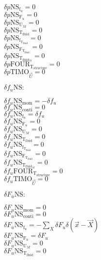 \documentclass[10pt]{article} %
\begin{document}
\begin{center}
	$\delta p \text{NS}_{\text{f}_u} = 0$\\
	$\delta p \text{NS}_{\text{F}_u} = 0$\\
	$\delta p \text{NS}_{\text{U}_M} = 0$\\
	$\delta p \text{NS}_{\text{T}_{\text{fluid}}} = 0$\\
	$\delta p \text{NS}_{\text{f}_{\text{T}_{\text{fluid}}}} = 0$\\
	$\delta p \text{NS}_{\text{F}_{\text{T}_{\text{fluid}}}} = 0$\\
	$\delta p \text{NS}_{\text{T}_{\text{fluid}_M}} = 0$\\
	$\delta p \text{FOUR}_{\text{T}_{\text{structure}}} = 0$\\
	$\delta p \text{TIMO}_{\vec{U}} = 0$\\
\begin{flushleft}
	$\delta f_u \text{NS}:$
\end{flushleft}
	$\delta f_u \text{NS}_{\text{mom}} =  -\delta f_u$\\
	$\delta f_u \text{NS}_{\text{conti}} = 0$\\
	$\delta f_u \text{NS}_{\text{f}_u} = \delta f_u$\\
	$\delta f_u \text{NS}_{\text{F}_u} = 0$\\
	$\delta f_u \text{NS}_{\text{U}_M} = 0$\\
	$\delta f_u \text{NS}_{\text{T}_{\text{fluid}}} = 0$\\
	$\delta f_u \text{NS}_{\text{f}_{\text{T}_{\text{fluid}}}} = 0$\\
	$\delta f_u \text{NS}_{\text{F}_{\text{T}_{\text{fluid}}}} = 0$\\
	$\delta f_u \text{NS}_{\text{T}_{\text{fluid}_M}} = 0$\\
	$\delta f_u \text{FOUR}_{\text{T}_{\text{structure}}} = 0$\\
	$\delta f_u \text{TIMO}_{\vec{U}} = 0$\\
\begin{flushleft}
	$\delta F_u \text{NS}:$
\end{flushleft}
	$\delta F_u \text{NS}_{\text{mom}} =  0$\\
	$\delta F_u \text{NS}_{\text{conti}} = 0$\\
	$\delta F_u \text{NS}_{\text{f}_u} = -\sum_X \delta F_u \delta (\vec{x}-\vec{X})$\\
	$\delta F_u \text{NS}_{\text{F}_u} = \delta F_u$\\
	$\delta F_u \text{NS}_{\text{U}_M} = 0$\\
	$\delta F_u \text{NS}_{\text{T}_{\text{fluid}}} = 0$\\

\end{center}
\end{document}
